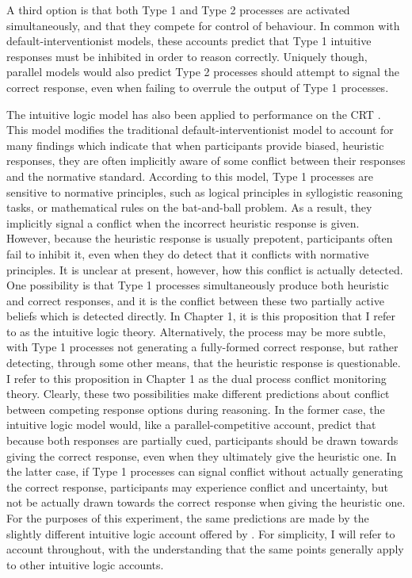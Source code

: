 A third option \citep{Sloman2014,Sloman1996}
is that both Type 1 and Type 2 processes are activated simultaneously,
and that they compete for control of behaviour.
In common with default-interventionist models,
these accounts predict that Type 1 intuitive responses
must be inhibited in order to reason correctly.
Uniquely though, parallel models would also predict Type 2 processes
should attempt to signal the correct response,
even when failing to overrule the output of Type 1 processes.

The intuitive logic model \citep{DeNeys2012,DeNeys2014a}
has also been applied to performance on the CRT \citep{DeNeys2013a}.
This model modifies the traditional default-interventionist model
to account for many findings which indicate that
when participants provide biased, heuristic responses,
they are often implicitly aware of some conflict between
their responses and the normative standard.
According to this model, Type 1 processes are sensitive to normative principles,
such as logical principles in syllogistic reasoning tasks,
or mathematical rules on the bat-and-ball problem.
As a result, they implicitly signal a conflict when
the incorrect heuristic response is given.
However, because the heuristic response is usually prepotent,
participants often fail to inhibit it,
even when they do detect that it conflicts with normative principles.
It is unclear at present, however, how this conflict is actually detected.
One possibility is that Type 1 processes simultaneously produce
both heuristic and correct responses,
and it is the conflict between these two partially active beliefs
which is detected directly.
In Chapter 1, it is this proposition that I refer to
as the intuitive logic theory.
Alternatively, the process may be more subtle,
with Type 1 processes not generating a fully-formed correct response,
but rather detecting, through some other means,
that the heuristic response is questionable.
I refer to this proposition in Chapter 1
as the dual process conflict monitoring theory.
Clearly, these two possibilities make different predictions
about conflict between competing response options during reasoning.
In the former case, the intuitive logic model would,
like a parallel-competitive account, predict that
because both responses are partially cued,
participants should be drawn towards giving the correct response,
even when they ultimately give the heuristic one.
In the latter case, if Type 1 processes can signal conflict
without actually generating the correct response,
participants may experience conflict and uncertainty,
but not be actually drawn towards the correct response when giving the heuristic one.
For the purposes of this experiment,
the same predictions are made by the slightly different
intuitive logic account offered by \citet{Handley2015}.
For simplicity, I will refer to 
account throughout, with the understanding that the same points generally apply
to other intuitive logic accounts.

